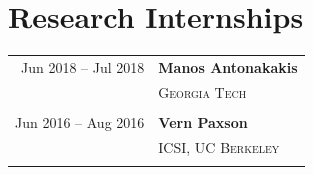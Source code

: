 \documentclass[10pt,singlecolumn]{article} %
\begin{document}
\section{Research Internships} 

\begin{tabular}{rl}
Jun 2018 -- Jul 2018 & \textbf{Manos Antonakakis}\\
& \textsc{Georgia Tech}\\
&\\

Jun 2016 -- Aug 2016 & \textbf{Vern Paxson}\\
& \textsc{ICSI, UC Berkeley}\\
& \\

\end{tabular}


%
%	
	
\end{document}
